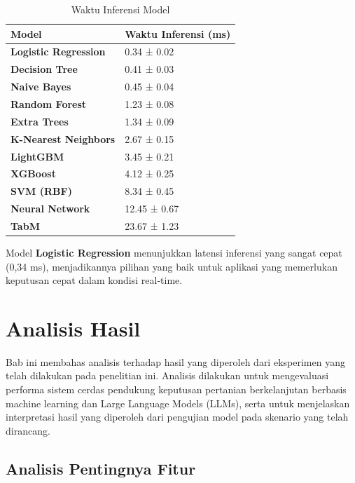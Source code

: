 \documentclass{article} %
\begin{document}
\begin{table}[h!]
\centering
\begin{tabular}{|l|l|}
\hline
\textbf{Model}           & \textbf{Waktu Inferensi (ms)} \\ \hline
\textbf{Logistic Regression}  & 0.34 ± 0.02              \\ \hline
\textbf{Decision Tree}       & 0.41 ± 0.03              \\ \hline
\textbf{Naive Bayes}         & 0.45 ± 0.04              \\ \hline
\textbf{Random Forest}       & 1.23 ± 0.08              \\ \hline
\textbf{Extra Trees}         & 1.34 ± 0.09              \\ \hline
\textbf{K-Nearest Neighbors} & 2.67 ± 0.15              \\ \hline
\textbf{LightGBM}            & 3.45 ± 0.21              \\ \hline
\textbf{XGBoost}             & 4.12 ± 0.25              \\ \hline
\textbf{SVM (RBF)}           & 8.34 ± 0.45              \\ \hline
\textbf{Neural Network}      & 12.45 ± 0.67             \\ \hline
\textbf{TabM}                & 23.67 ± 1.23             \\ \hline
\end{tabular}
\caption{Waktu Inferensi Model}
\end{table}

Model \textbf{Logistic Regression} menunjukkan latensi inferensi yang sangat cepat (0,34 ms), menjadikannya pilihan yang baik untuk aplikasi yang memerlukan keputusan cepat dalam kondisi real-time.


\section{Analisis Hasil}

Bab ini membahas analisis terhadap hasil yang diperoleh dari eksperimen yang telah dilakukan pada penelitian ini. Analisis dilakukan untuk mengevaluasi performa sistem cerdas pendukung keputusan pertanian berkelanjutan berbasis machine learning dan Large Language Models (LLMs), serta untuk menjelaskan interpretasi hasil yang diperoleh dari pengujian model pada skenario yang telah dirancang.

\subsection{Analisis Pentingnya Fitur}
\end{document}
